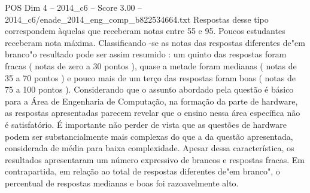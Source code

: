 \begin{textsample}{POS Dim 4 – 2014\_c6 – Score 3.00 – 2014\_c6/enade\_2014\_eng\_comp\_b822534664.txt}
Respostas desse tipo correspondem àquelas que receberam notas entre 55 e 95.
Poucos estudantes receberam nota máxima.
Classificando -se as notas das respostas diferentes de"em branco"o resultado pode ser assim resumido : um quinto das respostas foram fracas ( notas de zero a 30 pontos ), quase a metade foram medianas ( notas de 35 a 70 pontos ) e pouco mais de um terço das respostas foram boas ( notas de 75 a 100 pontos ).
Considerando que o assunto abordado pela questão é básico para a Área de Engenharia de Computação, na formação da parte de hardware, as respostas apresentadas parecem revelar que o ensino nessa área específica não é satisfatório.
É importante não perder de vista que as questões de hardware podem ser substancialmente mais complexas do que a da questão apresentada, considerada de média para baixa complexidade.
Apesar dessa característica, os resultados apresentaram um número expressivo de brancos e respostas fracas.
Em contrapartida, em relação ao total de respostas diferentes de"em branco", o percentual de respostas medianas e boas foi razoavelmente alto.

\end{textsample}
